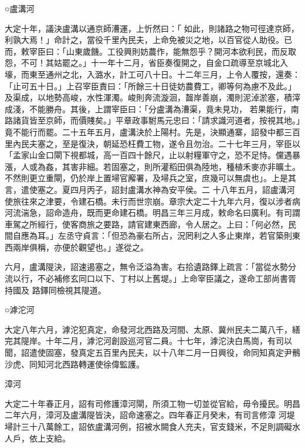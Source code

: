 \begin{pinyinscope}
 ○盧溝河



 大定十年，議決盧溝以通京師漕運，上忻然曰：「
 如此，則諸路之物可徑達京師，利孰大焉！」命計之，當役千里內民夫，上命免被災之地，以百官從人助役。已而，敕宰臣曰：「山東歲饑。工役興則妨農作，能無怨乎？開河本欲利民，而反取怨，不可！其姑罷之。」十一年十二月，省臣奏復開之，自金口疏導至京城北入壕，而東至通州之北，入潞水，計工可八十日。十二年三月，上令人覆按，還奏：「止可五十日。」上召宰臣責曰：「所餘三十日徒妨農費工，卿等何為慮不及此。」及渠成，以地勢高峻，水性渾濁。峻則奔流漩洄，齧岸善崩，濁則泥淖淤塞，積滓成淺，不能勝舟。其後，上謂宰臣曰：「分盧溝為漕渠，竟未見功，
 若果能行，南路諸貨皆至京師，而價賤矣。」平章政事駙馬元忠曰：「請求識河道者，按視其地。」竟不能行而罷。二十五年五月，盧溝決於上陽村。先是，決顯通寨，詔發中都三百里內民夫塞之，至是復決，朝延恐枉費工物，遂令且勿治。二十七年三月，宰臣以「孟家山金口閘下視都城，高一百四十餘尺，止以射糧軍守之，恐不足恃。儻遇暴漲，人或為姦，其害非細。若固塞之，則所灌稻田俱為陸地，種植禾麥亦非曠土。不然則更立重閘，仍於岸上置埽官廨署，及埽兵之室，庶幾可以無虞也」。上是其言，遣使塞之。夏四月丙子，詔封盧溝水神為安平侯。二
 十八年五月，詔盧溝河使旅往來之津要，令建石橋。未行而世宗崩。章宗大定二十九年六月，復以涉者病河流湍急，詔命造舟，既而更命建石橋。明昌三年三月成，敕命名曰廣利。有司謂車駕之所經行，使客商旅之要路，請官建東西廊，令人居之。上曰：「何必然，民間自應為耳。」左丞守貞言：「但恐為豪右所占，況罔利之人多止東岸，若官築則東西兩岸俱稱，亦便於觀望也。」遂從之。



 六月，盧溝隄決，詔速遏塞之，無令泛溢為害。右拾遺路鐸上疏言：「當從水勢分流以行，不必補修玄同口以下、丁村以上舊堤。」上命宰臣議之，遂命工部尚書胥持國及
 路鐸同檢視其隄道。



 ○滹沱河



 大定八年六月，滹沱犯真定，命發河北西路及河間、太原、冀州民夫二萬八千，繕完其隄岸。十年二月，滹沱河創設巡河官二員。十七年，滹沱決白馬崗，有司以聞，詔遣使固塞，發真定五百里內民夫，以十八年二月一日興役，命同知真定尹鶻沙虎、同知河北西路轉運使徐偉監護。



 漳河



 大定二十年春正月，詔有司修護漳河閘，所須工物一切並從官給，毋令擾民。明昌二年六月，漳河及盧溝隄皆決，詔命速塞之。四年春正月癸未，有司言修漳
 河堤埽計三十八萬餘工，詔依盧溝河例，招被水闕食人充夫，官支錢米，不足則調礙水人戶，依上支給。



\end{pinyinscope}